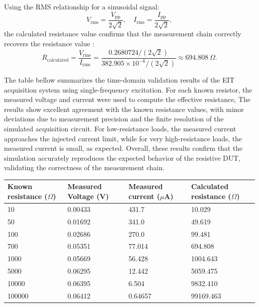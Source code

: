 \noindent Using the RMS relationship for a sinusoidal signal:
\[
V_\mathrm{rms} = \frac{V_\mathrm{pp}}{2\sqrt{2}}, \quad 
I_\mathrm{rms} = \frac{I_\mathrm{pp}}{2\sqrt{2}},
\]
the calculated resistance value confirms that the measurement chain correctly recovers the resistance value :
\begin{equation}
R_\text{calculated} = \frac{V_\mathrm{rms}}{I_\mathrm{rms}} 
= \frac{0.2680724 / (2\sqrt{2})}{382.905 \times 10^{-6} / (2\sqrt{2})} 
\approx 694.808~\Omega.
\end{equation}


The table bellow summarizes the time-domain validation results of the EIT acquisition system using single-frequency excitation. For each known resistor, the measured voltage and current were used to compute the effective resistance, The results show excellent agreement with the known resistance values, with minor deviations due to measurement precision and the finite resolution of the simulated acquisition circuit. For low-resistance loads, the measured current approaches the injected current limit, while for very high-resistance loads, the measured current is small, as expected. Overall, these results confirm that the simulation accurately reproduces the expected behavior of the resistive DUT, validating the correctness of the measurement chain.
\begin{table}[H]
\centering
\label{tab:single_freq_verification}
\begin{tabular}{|p{3cm}|p{3cm}|p{3cm}|p{3cm}|}
\hline
\textbf{Known resistance (\(\Omega\))} & \textbf{Measured Voltage (V)} & \textbf{Measured current (\(\mu\)A)} & \textbf{Calculated resistance (\(\Omega\))} \\ \hline
10  & 0.00433 & 431.7  & 10.029 \\ \hline
50  & 0.01692 & 341.0 & 49.619 \\ \hline
100  & 0.02686 & 270.0 & 99.481 \\ \hline
700  & 0.05351 & 77.014 & 694.808 \\ \hline
1000 & 0.05669 & 56.428 & 1004.643 \\ \hline
5000 & 0.06295 & 12.442 & 5059.475 \\ \hline
10000 & 0.06395 & 6.504 & 9832.410 \\ \hline
100000 & 0.06412 & 0.64657 & 99169.463 \\ \hline

\end{tabular}
\end{table}



